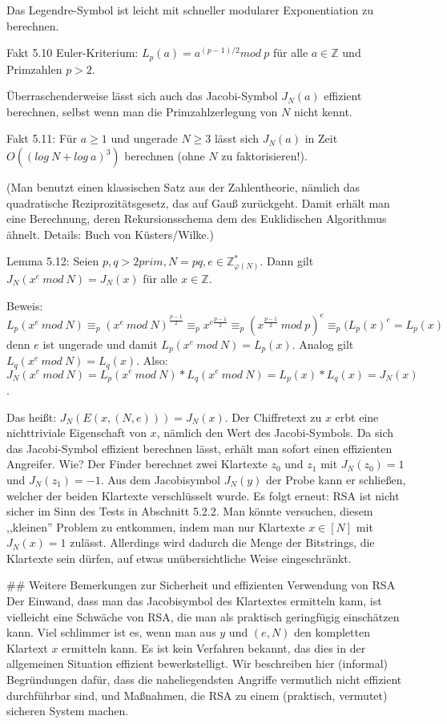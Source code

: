 \documentclass[a4paper]{article}
\begin{document}
\begin{multicols}{3}
{{{{            Das Legendre-Symbol ist leicht mit schneller modularer Exponentiation zu berechnen.

            Fakt 5.10 Euler-Kriterium: $L_p(a) =a^{(p-1)/ 2}mod\ p$ für alle $a\in\mathbb{Z}$ und Primzahlen $p>2$.

            Überraschenderweise lässt sich auch das Jacobi-Symbol $J_N(a)$ effizient berechnen, selbst wenn man die Primzahlzerlegung von $N$ nicht kennt.

            Fakt 5.11: Für $a\geq 1$ und ungerade $N\geq 3$ lässt sich $J_N(a)$ in Zeit $O((log\ N+log\ a)^3)$ berechnen (ohne $N$ zu faktorisieren!).

            (Man benutzt einen klassischen Satz aus der Zahlentheorie, nämlich das quadratische Reziprozitätsgesetz, das auf Gauß zurückgeht. Damit erhält man eine Berechnung, deren Rekursionsschema dem des Euklidischen Algorithmus ähnelt. Details: Buch von Küsters/Wilke.)

            Lemma 5.12: Seien $p,q >2 prim,N=pq,e\in\mathbb{Z}^*_{\varphi(N)}$. Dann gilt $J_N(x^e\ mod\ N) =J_N(x)$ für alle $x\in\mathbb{Z}$.

            Beweis: $L_p(x^e\ mod\ N)\equiv_p (x^e\ mod\ N)^{\frac{p-1}{2}} \equiv_p x^{e\frac{p-1}{2}} \equiv_p (x^{\frac{p-1}{2}}\ mod\ p)^e \equiv_p (L_p(x)^e =L_p(x)$
            denn $e$ ist ungerade und damit $L_p(x^e\ mod\ N) =L_p(x)$. Analog gilt $L_q(x^e\ mod\ N) =L_q(x)$.
            Also: $J_N(x^e\ mod\ N) =L_p(x^e\ mod\ N)*L_q(x^e\ mod\ N) =L_p(x)*L_q(x) =J_N(x)$.

            Das heißt: $J_N(E(x,(N,e))) =J_N(x)$. Der Chiffretext zu $x$ erbt eine nichttriviale Eigenschaft von $x$, nämlich den Wert des Jacobi-Symbols. Da sich das Jacobi-Symbol effizient berechnen lässt, erhält man sofort einen effizienten Angreifer. Wie? Der Finder berechnet zwei Klartexte $z_0$ und $z_1$ mit $J_N(z_0) = 1$ und $J_N(z_1) = -1$. Aus dem Jacobisymbol $J_N(y)$ der Probe kann er schließen, welcher der beiden Klartexte verschlüsselt wurde. Es folgt erneut: RSA ist nicht sicher im Sinn des Tests in Abschnitt 5.2.2.
            Man könnte versuchen, diesem ,,kleinen'' Problem zu entkommen, indem man nur Klartexte $x\in [N]$ mit $J_N(x) = 1$ zulässt. Allerdings wird dadurch die Menge der Bitstrings, die Klartexte sein dürfen, auf etwas unübersichtliche Weise eingeschränkt.


            ## Weitere Bemerkungen zur Sicherheit und effizienten Verwendung von RSA
            Der Einwand, dass man das Jacobisymbol des Klartextes ermitteln kann, ist vielleicht eine Schwäche von RSA, die man als praktisch geringfügig einschätzen kann. Viel schlimmer ist es, wenn man aus $y$ und $(e,N)$ den kompletten Klartext $x$ ermitteln kann. Es ist kein Verfahren bekannt, das dies in der allgemeinen Situation effizient bewerkstelligt. Wir beschreiben hier (informal) Begründungen dafür, dass die naheliegendsten Angriffe vermutlich nicht effizient durchführbar sind, und Maßnahmen, die RSA zu einem (praktisch, vermutet) sicheren System machen.

}}}}
\end{multicols}
\end{document}

